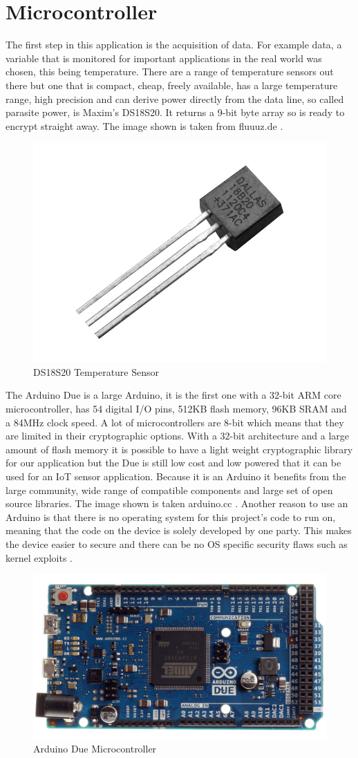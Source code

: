 \section{Microcontroller}

The first step in this application is the acquisition of data. For example data, a variable that is monitored for important applications in the real world was chosen, this being temperature. There are a range of temperature sensors out there but one that is compact, cheap, freely available, has a large temperature range, high precision and can derive power directly from the data line, so called parasite power, is Maxim's DS18S20. It returns a 9-bit byte array so is ready to encrypt straight away. The image shown is taken from fluuuz.de \cite{dsimage}.

\begin{figure}[H]
	\centering
	\includegraphics[width=.4\linewidth]{Figures/ds.jpg}
	\caption{DS18S20 Temperature Sensor}
	\label{fig:ds}
\end{figure}

The Arduino Due is a large Arduino, it is the first one with a 32-bit ARM core microcontroller, has 54 digital I/O pins, 512KB flash memory, 96KB SRAM and a 84MHz clock speed. A lot of microcontrollers are 8-bit which means that they are limited in their cryptographic options. With a 32-bit architecture and a large amount of flash memory it is possible to have a light weight cryptographic library for our application but the Due is still low cost and low powered that it can be used for an IoT sensor application. Because it is an Arduino it benefits from the large community, wide range of compatible components and large set of open source libraries. The image shown is taken arduino.cc \cite{dueimage}. Another reason to use an Arduino is that there is no operating system for this project's code to run on, meaning that the code on the device is solely developed by one party. This makes the device easier to secure and there can be no OS specific security flaws such as kernel exploits \cite{kernel}.

\begin{figure}[H]
	\centering
	\includegraphics[width=.4\linewidth]{Figures/due.jpg}
	\caption{Arduino Due Microcontroller}
	\label{fig:due}
\end{figure}

